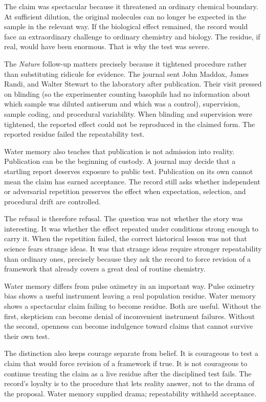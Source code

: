 The claim was spectacular because it threatened an ordinary chemical
boundary. At sufficient dilution, the original molecules can no longer be
expected in the sample in the relevant way. If the biological effect
remained, the record would face an extraordinary challenge to ordinary
chemistry and biology. The residue, if real, would have been
enormous. That is why the test was severe.

The \emph{Nature} follow-up matters precisely because it tightened procedure
rather than substituting ridicule for evidence. The journal sent John
Maddox, James Randi, and Walter Stewart to the laboratory after publication.
Their visit pressed on blinding (so the experimenter counting basophils had
no information about which sample was diluted antiserum and which was a
control), supervision, sample coding, and procedural variability. When
blinding and supervision were tightened, the reported effect could not be
reproduced in the claimed form. The reported residue failed the
repeatability test.

Water memory also teaches that publication is not admission into reality.
Publication can be the beginning of custody. A journal may decide that a
startling report deserves exposure to public test. Publication on its own
cannot mean the claim has earned acceptance. The record still asks whether
independent or adversarial repetition preserves the effect when expectation,
selection, and procedural drift are controlled.

The refusal is therefore  refusal. The question was not
whether the story was interesting. It was whether the effect repeated under
conditions strong enough to carry it. When the repetition failed, the
correct historical lesson was not that science fears strange ideas. It was
that strange ideas require stronger repeatability than ordinary ones,
precisely because they ask the record to force revision of a framework that
already covers a great deal of routine chemistry.

Water memory differs from pulse oximetry in an important way. Pulse
oximetry bias shows a useful instrument leaving a real population residue.
Water memory shows a spectacular claim failing to become residue. Both are
useful. Without the first, skepticism can become denial of inconvenient
instrument failures. Without the second, openness can become indulgence
toward claims that cannot survive their own test.

The distinction also keeps courage separate from belief. It is
courageous to test a claim that would force revision of a framework if true.
It is not courageous to continue treating the claim as a live residue after
the disciplined test fails. The record's loyalty is to the procedure that
lets reality answer, not to the drama of the proposal. Water memory
supplied drama; repeatability withheld acceptance.

